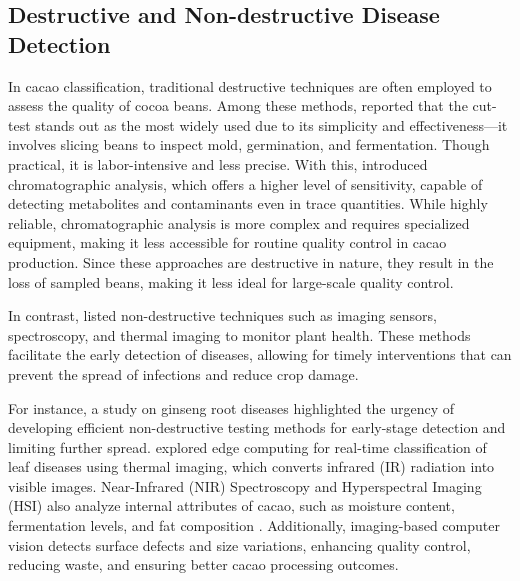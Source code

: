 \subsection*{Destructive and Non-destructive Disease Detection}
In cacao classification, traditional destructive techniques are often employed to assess the quality of cocoa beans. Among these methods, \cite{Nguyen2022} reported that the cut-test stands out as the most widely used due to its simplicity and effectiveness—it involves slicing beans to inspect mold, germination, and fermentation. Though practical, it is labor-intensive and less precise. With this, \cite{Quelal2020} introduced chromatographic analysis, which offers a higher level of sensitivity, capable of detecting metabolites and contaminants even in trace quantities. While highly reliable, chromatographic analysis is more complex and requires specialized equipment, making it less accessible for routine quality control in cacao production. Since these approaches are destructive in nature, they result in the loss of sampled beans, making it less ideal for large-scale quality control.

In contrast, \cite{Alvarado2023} listed non-destructive techniques such as imaging sensors, spectroscopy, and thermal imaging to monitor plant health. These methods facilitate the early detection of diseases, allowing for timely interventions that can prevent the spread of infections and reduce crop damage.

For instance, a study on ginseng root diseases highlighted the urgency of developing efficient non-destructive testing methods for early-stage detection and limiting further spread. \cite{Silva2024} explored edge computing for real-time classification of leaf diseases using thermal imaging, which converts infrared (IR) radiation into visible images. Near-Infrared (NIR) Spectroscopy and Hyperspectral Imaging (HSI) also analyze internal attributes of cacao, such as moisture content, fermentation levels, and fat composition \cite{Alvarado2023}. Additionally, imaging-based computer vision detects surface defects and size variations, enhancing quality control, reducing waste, and ensuring better cacao processing outcomes.

